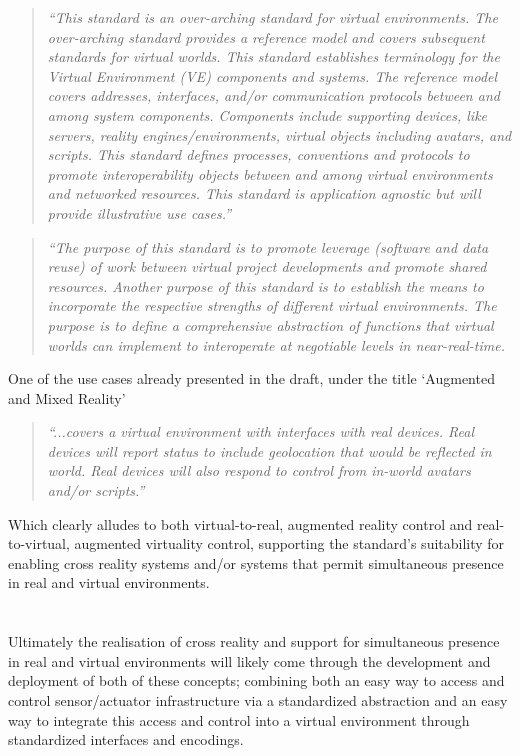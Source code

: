 \begin{quote}
\textit{``This standard is an over-arching standard for virtual environments. The over-arching standard provides a reference model and covers subsequent standards for virtual worlds. This standard establishes terminology for the Virtual Environment (VE) components and systems. The reference model covers addresses, interfaces, and/or communication protocols between and among system components. Components include supporting devices, like servers, reality engines/environments, virtual objects including avatars, and scripts. This standard defines processes, conventions and protocols to promote interoperability objects between and among virtual environments and networked resources. This standard is application agnostic but will provide illustrative use cases.''}
\end{quote}

\begin{quote}
\textit{``The purpose of this standard is to promote leverage (software and data reuse) of work between virtual project developments and promote shared resources. Another purpose of this standard is to establish the means to incorporate the respective strengths of different virtual environments. The purpose is to define a comprehensive abstraction of functions that virtual worlds can implement to interoperate at negotiable levels in near-real-time.}~\cite{InstituteofElectricalandElectronicsEngineers2012}
\end{quote}

One of the use cases already presented in the draft, under the title `Augmented and Mixed Reality'

\begin{quote}
\textit{``...covers a virtual environment with interfaces with real devices. Real devices will report status to include geolocation that would be reflected in world. Real devices will also respond to control from in-world avatars and/or scripts.''}
\end{quote}

Which clearly alludes to both virtual-to-real, augmented reality control and real-to-virtual, augmented virtuality control, supporting the standard's suitability for enabling cross reality systems and/or systems that permit simultaneous presence in real and virtual environments.
\\
\\
\\
Ultimately the realisation of cross reality and support for simultaneous presence in real and virtual environments will likely come through the development and deployment of both of these concepts; combining both an easy way to access and control sensor/actuator infrastructure via a standardized abstraction and an easy way to integrate this access and control into a virtual environment through standardized interfaces and encodings.

